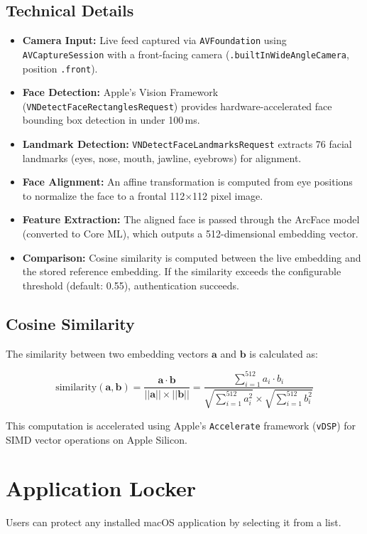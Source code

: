 \documentclass[12pt,a4paper]{report}
\begin{document}
\subsection{Technical Details}
\begin{itemize}
    \item \textbf{Camera Input:} Live feed captured via \texttt{AVFoundation} using \texttt{AVCaptureSession} with a front-facing camera (\texttt{.builtInWideAngleCamera}, position \texttt{.front}).
    \item \textbf{Face Detection:} Apple's Vision Framework (\texttt{VNDetectFaceRectanglesRequest}) provides hardware-accelerated face bounding box detection in under 100\,ms.
    \item \textbf{Landmark Detection:} \texttt{VNDetectFaceLandmarksRequest} extracts 76 facial landmarks (eyes, nose, mouth, jawline, eyebrows) for alignment.
    \item \textbf{Face Alignment:} An affine transformation is computed from eye positions to normalize the face to a frontal 112$\times$112 pixel image.
    \item \textbf{Feature Extraction:} The aligned face is passed through the ArcFace model (converted to Core ML), which outputs a 512-dimensional embedding vector.
    \item \textbf{Comparison:} Cosine similarity is computed between the live embedding and the stored reference embedding. If the similarity exceeds the configurable threshold (default: 0.55), authentication succeeds.
\end{itemize}

\subsection{Cosine Similarity}
The similarity between two embedding vectors $\mathbf{a}$ and $\mathbf{b}$ is calculated as:

\[
\text{similarity}(\mathbf{a}, \mathbf{b}) = \frac{\mathbf{a} \cdot \mathbf{b}}{||\mathbf{a}|| \times ||\mathbf{b}||} = \frac{\sum_{i=1}^{512} a_i \cdot b_i}{\sqrt{\sum_{i=1}^{512} a_i^2} \times \sqrt{\sum_{i=1}^{512} b_i^2}}
\]

This computation is accelerated using Apple's \texttt{Accelerate} framework (\texttt{vDSP}) for SIMD vector operations on Apple Silicon.

\section{Application Locker}
Users can protect any installed macOS application by selecting it from a list.
\end{document}
